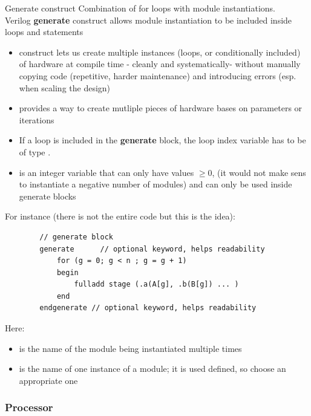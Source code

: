 \begin{parag}{Generate construct}
    Combination of for loops with module instantiations.\\
    Verilog \textbf{generate} construct allows module instantiation to be included inside  loops and  statements
    \begin{itemize}
        \item {} construct lets us create multiple instances (loops, or conditionally included) of hardware at compile time - cleanly and systematically- without manually copying code (repetitive, harder maintenance) and introducing errors (esp. when scaling the design)
        \item {} provides a way to create mutliple pieces of hardware bases on parameters or iterations
        \item If a  loop is included in the \textbf{generate} block, the loop index variable has to be of type .
        \item {} is an integer variable that can only have values $\geq 0$, (it would not make sens to instantiate a negative number of modules) and can only be used inside generate blocks
    \end{itemize}
    For instance (there is not the entire code but this is the idea):
    \begin{lstlisting}
        // generate block
        generate      // optional keyword, helps readability
            for (g = 0; g < n ; g = g + 1) 
            begin
                fulladd stage (.a(A[g], .b(B[g]) ... )
            end
        endgenerate // optional keyword, helps readability
    \end{lstlisting}
    Here:
    \begin{itemize}
        \item {} is the name of the module being instantiated multiple times
        \item {} is the name of one instance of a module; it is used defined, so choose an appropriate one
    \end{itemize}
    
\end{parag}




\subsubsection{Processor}


